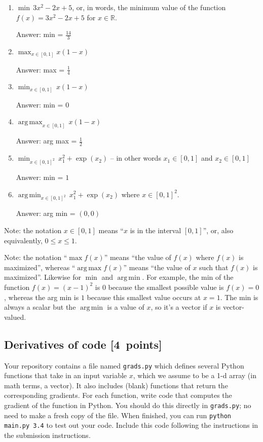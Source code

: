 \documentclass{article}
\newcommand{\blu}[1]{{\textcolor{blu}{#1}}}
\newenvironment{answer}{\par\begingroup\color{gre}Answer: }{\endgroup}
\let\ask\blu
\newcommand\pts[1]{\textcolor{pointscolour}{[#1~points]}}
\def\R{\mathbb{R}}
\DeclareMathOperator*{\argmax}{arg\,max}
\DeclareMathOperator*{\argmin}{arg\,min}
\begin{document}
  \begin{enumerate}
  \item $\min \, 3x^2-2x+5$, or, in words, the minimum value of the function $f(x) = 3x^2 -2x + 5$ for $x \in \R$.
  \begin{answer}
    min = $\frac{14}{3}$
  \end{answer}
  \item $\max_{x \in [0, 1]} x(1-x)$
  \begin{answer}
    max = $\frac{1}{4}$
  \end{answer}
  \item $\min_{x \in [0, 1]} \, x(1-x)$
  \begin{answer}
    min = $0$
  \end{answer}
  \item $\argmax_{x \in [0,1]} \, x(1-x)$
  \begin{answer}
    arg max = $\frac{1}{2}$
  \end{answer}
  \item $\min_{x \in [0, 1]^2} \, x_1^2 + \exp(x_2)$ -- in other words $x_1\in [0,1]$ and $x_2\in [0,1]$
  \begin{answer}
    min = $1$
  \end{answer}
  \item $\argmin_{x \in [0,1]^2} \, x_1^2 + \exp(x_2)$ where $x \in [0,1]^2$.
  \begin{answer}
    arg min = $(0,0)$
  \end{answer}
  \end{enumerate}

  Note: the notation $x\in [0,1]$ means ``$x$ is in the interval $[0,1]$'', or, also equivalently, $0 \leq x \leq 1$.

  Note: the notation ``$\max f(x)$'' means ``the value of $f(x)$ where $f(x)$ is maximized'', whereas ``$\argmax  f(x)$'' means ``the value of $x$ such that $f(x)$ is maximized''.
  Likewise for $\min$ and $\argmin$. For example, the min of the function $f(x)=(x-1)^2$ is $0$ because the smallest possible value is $f(x)=0$,
  whereas the arg min is $1$ because this smallest value occurs at $x=1$. The min is always a scalar but the $\argmin$ is a value of $x$, so it's a vector
  if $x$ is vector-valued.

  \subsection{Derivatives of code \pts{4}}

  Your repository contains a file named \texttt{grads.py} which defines several Python functions that take in an input variable $x$, which we assume to be a 1-d array (in math terms, a vector).
  It also includes (blank) functions that return the corresponding gradients.
  For each function, \ask{write code that computes the gradient of the function} in Python.
  You should do this directly in \texttt{grads.py}; no need to make a fresh copy of the file. When finished, you can run \texttt{python main.py 3.4} to test out your code. \ask{Include this code following the instructions in the submission instructions.}
\end{document}
